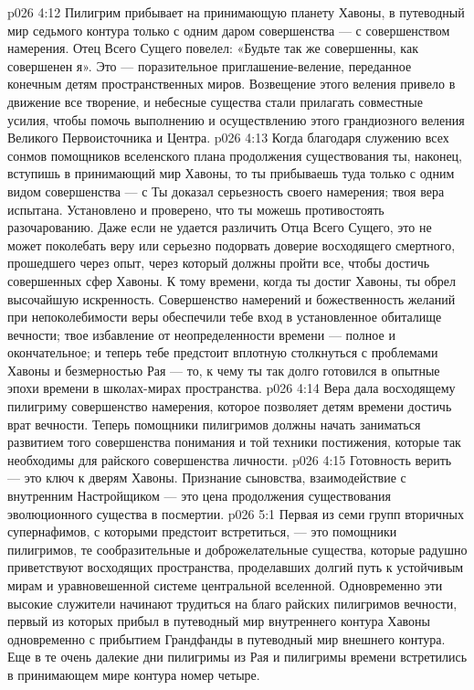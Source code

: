 \vs p026 4:12 Пилигрим прибывает на принимающую планету Хавоны, в путеводный мир седьмого контура только с одним даром совершенства --- с совершенством намерения. Отец Всего Сущего повелел: «Будьте так же совершенны, как совершенен я». Это --- поразительное приглашение\hyp{}веление, переданное конечным детям пространственных миров. Возвещение этого веления привело в движение все творение, и небесные существа стали прилагать совместные усилия, чтобы помочь выполнению и осуществлению этого грандиозного веления Великого Первоисточника и Центра.
\vs p026 4:13 Когда благодаря служению всех сонмов помощников вселенского плана продолжения существования ты, наконец, вступишь в принимающий мир Хавоны, то ты прибываешь туда только с одним видом совершенства --- с  Ты доказал серьезность своего намерения; твоя вера испытана. Установлено и проверено, что ты можешь противостоять разочарованию. Даже если не удается различить Отца Всего Сущего, это не может поколебать веру или серьезно подорвать доверие восходящего смертного, прошедшего через опыт, через который должны пройти все, чтобы достичь совершенных сфер Хавоны. К тому времени, когда ты достиг Хавоны, ты обрел высочайшую искренность. Совершенство намерений и божественность желаний при непоколебимости веры обеспечили тебе вход в установленное обиталище вечности; твое избавление от неопределенности времени --- полное и окончательное; и теперь тебе предстоит вплотную столкнуться с проблемами Хавоны и безмерностью Рая --- то, к чему ты так долго готовился в опытные эпохи времени в школах\hyp{}мирах пространства.
\vs p026 4:14 Вера дала восходящему пилигриму совершенство намерения, которое позволяет детям времени достичь врат вечности. Теперь помощники пилигримов должны начать заниматься развитием того совершенства понимания и той техники постижения, которые так необходимы для райского совершенства личности.
\vs p026 4:15  Готовность верить --- это ключ к дверям Хавоны. Признание сыновства, взаимодействие с внутренним Настройщиком --- это цена продолжения существования эволюционного существа в посмертии.
\vs p026 5:1 Первая из семи групп вторичных супернафимов, с которыми предстоит встретиться, --- это помощники пилигримов, те сообразительные и доброжелательные существа, которые радушно приветствуют восходящих пространства, проделавших долгий путь к устойчивым мирам и уравновешенной системе центральной вселенной. Одновременно эти высокие служители начинают трудиться на благо райских пилигримов вечности, первый из которых прибыл в путеводный мир внутреннего контура Хавоны одновременно с прибытием Грандфанды в путеводный мир внешнего контура. Еще в те очень далекие дни пилигримы из Рая и пилигримы времени встретились в принимающем мире контура номер четыре.
